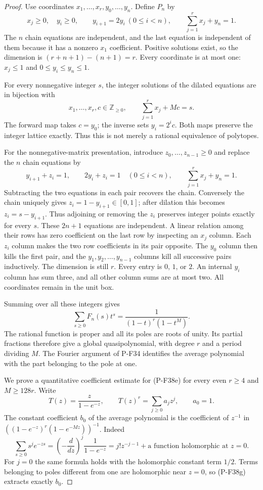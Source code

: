 \documentclass[11pt,a4paper]{article}
\begin{document}
\begin{proof}
Use coordinates
$x_1,\ldots,x_r,y_0,\ldots,y_n$. Define $P_n$ by
\[
 x_j\ge0,\quad y_i\ge0,\qquad
 y_{i+1}=2y_i\ (0\le i<n),\qquad
 \sum_{j=1}^{r}x_j+y_n=1.
 \tag{P-F38c}
\]
The $n$ chain equations are independent, and the last equation
is independent of them because it has a nonzero $x_1$
coefficient. Positive solutions exist, so the dimension is
$(r+n+1)-(n+1)=r$. Every coordinate is at most one:
$x_j\le1$ and $0\le y_i\le y_n\le1$.

For every nonnegative integer $s$, the integer solutions of
the dilated equations are in bijection with
\[
 x_1,\ldots,x_r,c\in\mathbb Z_{\ge0},
 \qquad \sum_{j=1}^{r}x_j+Mc=s.
 \tag{P-F38d}
\]
The forward map takes $c=y_0$; the inverse sets $y_i=2^ic$.
Both maps preserve the integer lattice exactly. Thus this is
not merely a rational equivalence of polytopes.

For the nonnegative-matrix presentation, introduce
$z_0,\ldots,z_{n-1}\ge0$ and replace the $n$ chain equations by
\[
 y_{i+1}+z_i=1,\qquad 2y_i+z_i=1\quad(0\le i<n),
 \qquad \sum_{j=1}^{r}x_j+y_n=1.
 \tag{P-F38d'}
\]
Subtracting the two equations in each pair recovers the
chain. Conversely the chain uniquely gives
$z_i=1-y_{i+1}\in[0,1]$; after dilation this becomes
$z_i=s-y_{i+1}$. Thus adjoining or removing the $z_i$
preserves integer points exactly for every $s$.
These $2n+1$ equations are independent. A linear relation
among their rows has zero coefficient on the last row
by inspecting an $x_j$ column. Each $z_i$ column makes
the two row coefficients in its pair opposite.
The $y_0$ column then kills the first pair, and the
$y_1,y_2,\ldots,y_{n-1}$ columns kill all successive
pairs inductively. The dimension is still $r$.
Every entry is $0$, $1$, or $2$. An internal $y_i$
column has sum three, and all other column sums are
at most two. All coordinates remain in the unit box.

Summing over all these integers gives
\[
 \sum_{s\ge0}F_n(s)t^s
          =\frac1{(1-t)^r(1-t^M)}.
 \tag{P-F38e}
\]
The rational function is proper and all its poles are roots
of unity. Its partial fractions therefore give a global
quasipolynomial, with degree $r$ and a period dividing $M$.
The Fourier argument of P-F34 identifies the average
polynomial with the part belonging to the pole at one.

We prove a quantitative coefficient estimate for (P-F38e)
for every even $r\ge4$ and $M\ge128r$. Write
\[
 T(z)=\frac{z}{1-e^{-z}},\qquad
 T(z)^r=\sum_{j\ge0}a_jz^j,\qquad a_0=1.
 \tag{P-F38f}
\]
The constant coefficient $b_0$ of the average polynomial
is the coefficient of $z^{-1}$ in
$((1-e^{-z})^r(1-e^{-Mz}))^{-1}$.
Indeed
\[
 \sum_{s\ge0}s^je^{-zs}
       =\left(-\frac{d}{dz}\right)^j\frac1{1-e^{-z}}
       =j!z^{-j-1}+\text{a function holomorphic at }z=0.
 \tag{P-F38g}
\]
For $j=0$ the same formula holds with the holomorphic
constant term $1/2$. Terms belonging to poles different
from one are holomorphic near $z=0$, so (P-F38g)
extracts exactly $b_0$.


\end{proof}
\end{document}
